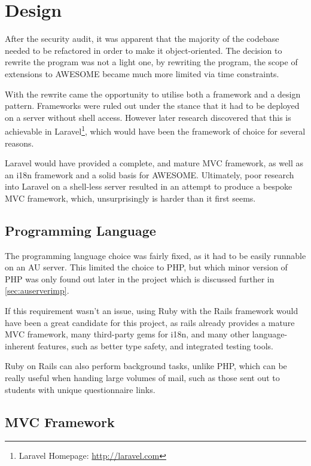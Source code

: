 \chapter{Design}
	
	After the security audit, it was apparent that the majority of the codebase needed to be refactored in order to make it object-oriented.
	The decision to rewrite the program was not a light one, by rewriting the program, the scope of extensions to \ac{AWESOME} became much more limited via time constraints.
	
	With the rewrite came the opportunity to utilise both a framework and a design pattern.
	Frameworks were ruled out under the stance that it had to be deployed on a server without shell access.
	However later research discovered that this is achievable in Laravel\footnote{Laravel Homepage: \url{http://laravel.com}}, which would have been the framework of choice for several reasons.
	
	Laravel would have provided a complete, and mature \ac{MVC} framework, as well as an \ac{i18n} framework and a solid basis for \ac{AWESOME}.
	Ultimately, poor research into Laravel on a shell-less server resulted in an attempt to produce a bespoke \ac{MVC} framework, which, unsurprisingly is harder than it first seems.
	
	\section{Programming Language}
	
	The programming language choice was fairly fixed, as it had to be easily runnable on an \ac{AU} server.
	This limited the choice to PHP, but which minor version of PHP was only found out later in the project which is discussed further in \autoref{sec:auserverimp}.
	
	If this requirement wasn't an issue, using Ruby with the Rails framework would have been a great candidate for this project, as rails already provides a mature \ac{MVC} framework, many third-party gems for \ac{i18n}, and many other language-inherent features, such as better type safety, and integrated testing tools.
	
	Ruby on Rails can also perform background tasks, unlike PHP, which can be really useful when handing large volumes of mail, such as those sent out to students with unique questionnaire links.
	
	\newpage
	
	\section{\acl{MVC} Framework}
	
